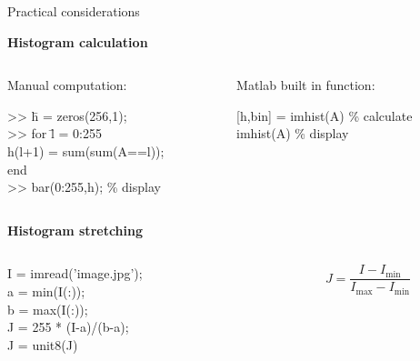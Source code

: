 %
%
\begin{slide}{Practical considerations}
\begin{bulletlist} %
\small
\item<2-> \textbf{Histogram calculation}
\begin{columns}
\begin{column}{0.5\textwidth}\scriptsize
Manual computation:
\begin{code}[8]{}
\begin{tabbing}
>>  \=  h = zeros(256,1); \\
>>	\>	for  \= l = 0:255   \\
	\>  \>   h(l+1) = sum(sum(A==l)); \\
	\>  end \\
>> \> bar(0:255,h); \% display \\
\end{tabbing}  
\end{code}
\end{column}
\begin{column}{0.5\textwidth}\scriptsize
Matlab built in function:
\begin{code}[8]{}
[h,bin] = imhist(A) \% calculate \\
imhist(A) \% display \\
\end{code}
\vfill
\end{column}
\end{columns}

\item<3-> \textbf{Histogram stretching}
\begin{columns}
\begin{column}{0.5\textwidth}
\begin{code}[8]{}
I = imread('image.jpg'); \\
a = min(I(:)); \\
b = max(I(:)); \\
J = 255 * (I-a)/(b-a); \\
J = unit8(J)
\end{code}
\end{column}
\begin{column}{0.5\textwidth}
\[
J = \dfrac{I - I_{\min}}{I_{\max} - I_{\min}}
\]
\end{column}
\end{columns}


\end{bulletlist}

\end{slide}


